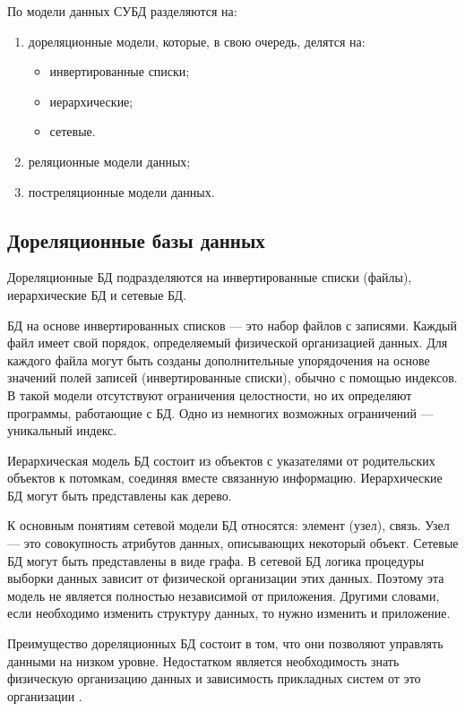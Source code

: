 По модели данных СУБД разделяются на:

\begin{enumerate}[label={\arabic*)}]
	\item дореляционные модели, которые, в свою очередь, делятся на:
	\begin{itemize}[label*=--]
		\item инвертированные списки;
		\item иерархические;
		\item сетевые.
	\end{itemize}
	\item реляционные модели данных;
	\item постреляционные модели данных.
\end{enumerate}

\subsection{Дореляционные базы данных}

Дореляционные БД подразделяются на инвертированные списки (файлы), иерархические БД и сетевые БД.

БД на основе инвертированных списков --- это набор файлов с записями. Каждый файл имеет свой порядок, определяемый физической организацией данных. Для каждого файла могут быть созданы дополнительные упорядочения на основе значений полей записей (инвертированные списки), обычно с помощью индексов. В такой модели отсутствуют ограничения целостности, но их определяют программы, работающие с БД. Одно из немногих возможных ограничений --- уникальный индекс.

Иерархическая модель БД состоит из объектов с указателями от родительских объектов к потомкам, соединяя вместе связанную информацию. Иерархические БД могут быть представлены как дерево. 

К основным понятиям сетевой модели БД относятся: элемент (узел), связь. Узел --- это совокупность атрибутов данных, описывающих некоторый объект. Сетевые БД могут быть представлены в виде графа. В сетевой БД логика процедуры выборки данных зависит от физической организации этих данных. Поэтому эта модель не является полностью независимой от приложения. Другими словами, если необходимо изменить структуру данных, то нужно изменить и приложение. 

Преимущество дореляционных БД состоит в том, что они позволяют управлять данными на низком уровне. Недостатком является необходимость знать физическую организацию данных и зависимость прикладных систем от это организации \cite{info_db_kuznecov}.

